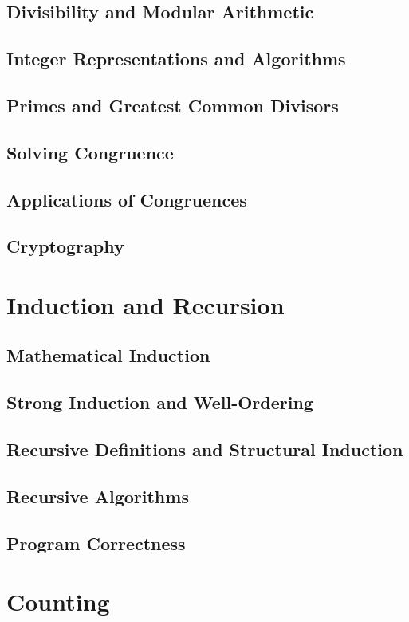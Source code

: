 \documentclass{article}
\begin{document}
\subsection{Divisibility and Modular Arithmetic}
\subsection{Integer Representations and Algorithms}
\subsection{Primes and Greatest Common Divisors}
\subsection{Solving Congruence}
\subsection{Applications of Congruences}
\subsection{Cryptography}

\section{Induction and Recursion}

\subsection{Mathematical Induction}
\subsection{Strong Induction and Well-Ordering}
\subsection{Recursive Definitions and Structural Induction}
\subsection{Recursive Algorithms}
\subsection{Program Correctness}

\section{Counting}
\end{document}
